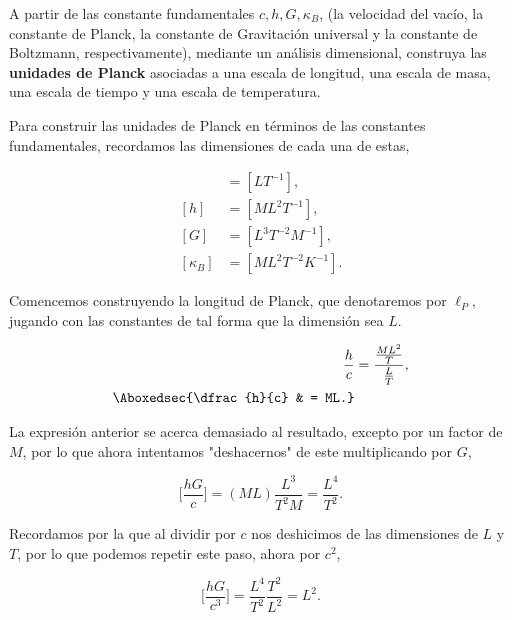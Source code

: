 \documentclass[../main.tex]{subfiles}
\begin{document}
\begin{problema}[10]
	A partir de las constante fundamentales \(c, h, G, \kappa_{B}\),
	(la velocidad del vacío, la constante de Planck, la constante de Gravitación universal
	y la constante de Boltzmann, respectivamente),
	mediante un análisis dimensional, construya las
	\textbf{unidades de Planck} asociadas a una escala de longitud,
	una escala de masa, una escala de tiempo y una escala de temperatura.

	\startsolution

	Para construir las unidades de Planck en términos de las constantes
	fundamentales, recordamos las dimensiones de cada una de estas,

	\begin{align*}
		[c]          & = [LT^{-1}],            \\
		[h]          & = [ML^{2}T^{-1}],       \\
		[G]          & = [L^{3}T^{-2}M^{-1}],  \\
		[\kappa_{B}] & = [ML^{2}T^{-2}K^{-1}].
	\end{align*}

	Comencemos construyendo la longitud de Planck, que denotaremos por
	\(\ell_{P}\), jugando con las constantes de tal forma que la dimensión
	sea \(L\).

	\begin{align}
		\dfrac{h}{c}            & = \dfrac{\tfrac{ML^{2}}{T}}{\tfrac{L}{T}},\nonumber \\
		\Aboxedsec{\dfrac{h}{c} & = ML.}\label{eq:hDividedbyC}
	\end{align}

	La expresión anterior se acerca demasiado al resultado, excepto por un factor de \(M\),
	por lo que ahora intentamos "deshacernos" de este multiplicando por \(G\),

	\begin{equation}
		\biggl[\dfrac{hG}{c}\biggr] = (ML)\dfrac{L^{3}}{T^{2}M} = \dfrac{L^{4}}{T^{2}}.
		\label{eq:hGDividedbyC}
	\end{equation}

	Recordamos por la  que al dividir por \(c\)
	nos deshicimos de las dimensiones de \(L\) y \(T\), por lo que podemos
	repetir este paso, ahora por \(c^{2}\),

	\begin{equation}
		\biggl[\dfrac{hG}{c^{3}}\biggr] = \dfrac{L^{4}}{T^{2}}\dfrac{T^{2}}{L^{2}} = L^{2}.
		\label{eq:hGDividedbyC3}
	\end{equation}


\end{problema}
\end{document}

